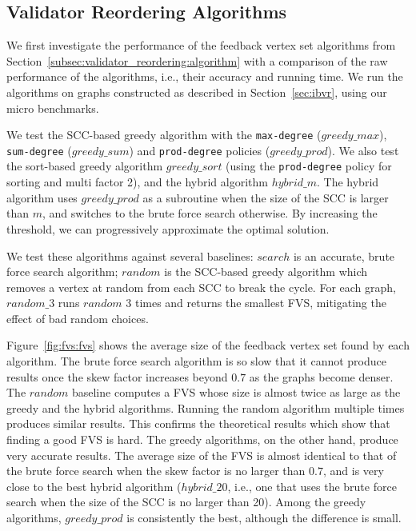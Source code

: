 \subsection{Validator Reordering Algorithms}
We first investigate the performance of the feedback vertex set algorithms from Section~\ref{subsec:validator_reordering:algorithm} with a comparison of the raw performance of the algorithms, i.e., their accuracy and running time. We run the algorithms on graphs constructed as described in Section~\ref{sec:ibvr}, using our micro benchmarks. 


We test the SCC-based greedy algorithm with the \texttt{max-degree} ($greedy\_max$), \texttt{sum-degree} ($greedy\_sum$) and \texttt{prod-degree} policies ($greedy\_prod$). We also test the sort-based greedy algorithm $greedy\_sort$ (using the \texttt{prod-degree} policy for sorting and multi factor 2), and the hybrid algorithm $hybrid\_m$. The hybrid algorithm uses $greedy\_prod$ as a subroutine when the size of the SCC is larger than $m$, and switches to the brute force search otherwise. By increasing the threshold, we can progressively approximate the optimal solution. 

We test these algorithms against several baselines: $search$ is an accurate,
brute force search algorithm; $random$ is the SCC-based greedy algorithm which
removes a vertex at random from each SCC to break the cycle. For each graph,
$random\_3$ runs $random$ 3 times and returns the smallest FVS, mitigating the
effect of bad random choices.


Figure~\ref{fig:fvs:fvs} shows the average size of the feedback vertex set found by each algorithm. The brute force search algorithm is so slow that it cannot produce results once the skew factor increases beyond $0.7$ as the graphs become denser.
The $random$ baseline computes a FVS whose size is almost twice as large as the greedy and the hybrid algorithms. Running the random algorithm multiple times produces similar results. This confirms the theoretical results which show that finding a good FVS is hard. The greedy algorithms, on the other hand, produce very accurate results. The average size of the FVS is almost identical to that of the brute force search when the skew factor is no larger than $0.7$, and is very close to the best hybrid algorithm ($hybrid\_20$, i.e., one that uses the brute force search when the size of the SCC is no larger than 20). Among the greedy algorithms, $greedy\_prod$ is consistently the best, although the difference is small.

